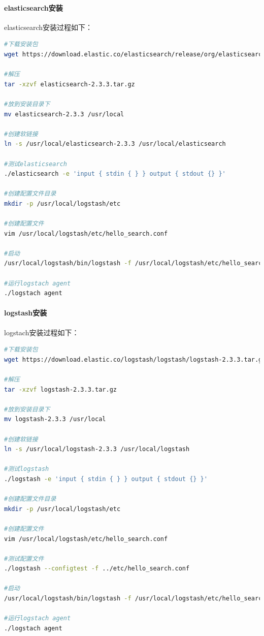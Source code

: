 \documentclass{book}
\begin{document}
\paragraph{elasticsearch安装}

elasticsearch安装过程如下：

\begin{lstlisting}[language=Bash]
#下载安装包
wget https://download.elastic.co/elasticsearch/release/org/elasticsearch/distribution/tar/elasticsearch/2.3.3/elasticsearch-2.3.3.tar.gz

#解压
tar -xzvf elasticsearch-2.3.3.tar.gz

#放到安装目录下
mv elasticsearch-2.3.3 /usr/local

#创建软链接
ln -s /usr/local/elasticsearch-2.3.3 /usr/local/elasticsearch

#测试elasticsearch
./elasticsearch -e 'input { stdin { } } output { stdout {} }'

#创建配置文件目录
mkdir -p /usr/local/logstash/etc

#创建配置文件
vim /usr/local/logstash/etc/hello_search.conf

#启动
/usr/local/logstash/bin/logstash -f /usr/local/logstash/etc/hello_search.conf

#运行logstach agent
./logstach agent
\end{lstlisting}

\paragraph{logstash安装}

logstach安装过程如下：

\begin{lstlisting}[language=Bash]
#下载安装包
wget https://download.elastic.co/logstash/logstash/logstash-2.3.3.tar.gz

#解压
tar -xzvf logstash-2.3.3.tar.gz

#放到安装目录下
mv logstash-2.3.3 /usr/local

#创建软链接
ln -s /usr/local/logstash-2.3.3 /usr/local/logstash

#测试logstash
./logstash -e 'input { stdin { } } output { stdout {} }'

#创建配置文件目录
mkdir -p /usr/local/logstash/etc

#创建配置文件
vim /usr/local/logstash/etc/hello_search.conf

#测试配置文件
./logstash --configtest -f ../etc/hello_search.conf

#启动
/usr/local/logstash/bin/logstash -f /usr/local/logstash/etc/hello_search.conf

#运行logstach agent
./logstach agent
\end{lstlisting}
\end{document}
